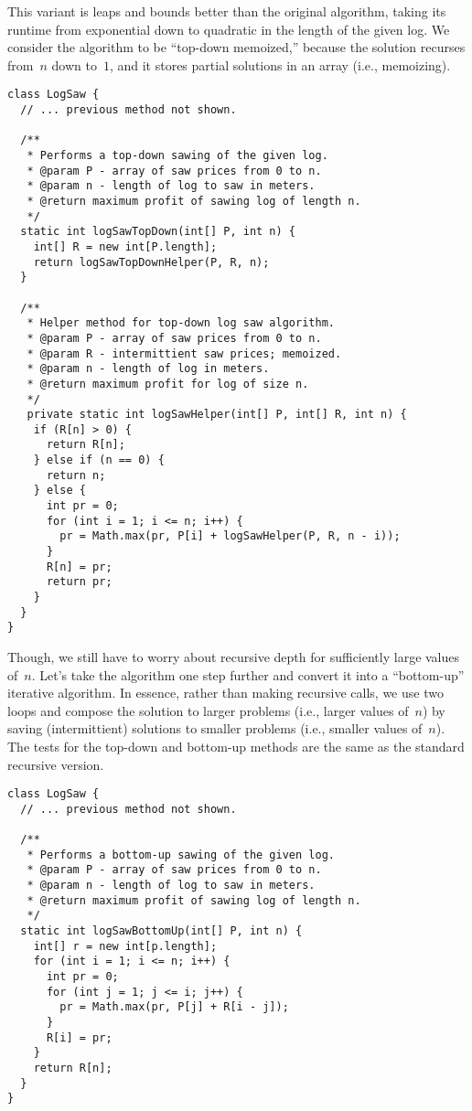 This variant is leaps and bounds better than the original algorithm, taking its runtime from exponential down to quadratic in the length of the given log. 
We consider the algorithm to be ``top-down memoized,'' because the solution recurses from~$n$ down to~$1$, and it stores partial solutions in an array (i.e., memoizing). 

\begin{lstlisting}[language=MyJava]
class LogSaw {
  // ... previous method not shown.

  /**
   * Performs a top-down sawing of the given log.
   * @param P - array of saw prices from 0 to n.
   * @param n - length of log to saw in meters.
   * @return maximum profit of sawing log of length n.
   */
  static int logSawTopDown(int[] P, int n) {
    int[] R = new int[P.length];
    return logSawTopDownHelper(P, R, n);
  }

  /**
   * Helper method for top-down log saw algorithm.
   * @param P - array of saw prices from 0 to n.
   * @param R - intermittient saw prices; memoized.
   * @param n - length of log in meters.
   * @return maximum profit for log of size n.
   */
   private static int logSawHelper(int[] P, int[] R, int n) {
    if (R[n] > 0) {
      return R[n];
    } else if (n == 0) {
      return n;
    } else {
      int pr = 0;
      for (int i = 1; i <= n; i++) {
        pr = Math.max(pr, P[i] + logSawHelper(P, R, n - i));
      }
      R[n] = pr;
      return pr;
    }
  }
}
\end{lstlisting}

Though, we still have to worry about recursive depth for sufficiently large values of~$n$. 
Let's take the algorithm one step further and convert it into a ``bottom-up'' iterative algorithm.
In essence, rather than making recursive calls, we use two loops and compose the solution to larger problems (i.e., larger values of~$n$) by saving (intermittient) solutions to smaller problems (i.e., smaller values of~$n$).
The tests for the top-down and bottom-up methods are the same as the standard recursive version.

\begin{lstlisting}[language=MyJava]
class LogSaw {
  // ... previous method not shown.

  /**
   * Performs a bottom-up sawing of the given log.
   * @param P - array of saw prices from 0 to n.
   * @param n - length of log to saw in meters.
   * @return maximum profit of sawing log of length n.
   */
  static int logSawBottomUp(int[] P, int n) {
    int[] r = new int[p.length];
    for (int i = 1; i <= n; i++) {
      int pr = 0;
      for (int j = 1; j <= i; j++) {
        pr = Math.max(pr, P[j] + R[i - j]);
      }
      R[i] = pr;
    }
    return R[n];
  }
}
\end{lstlisting}

